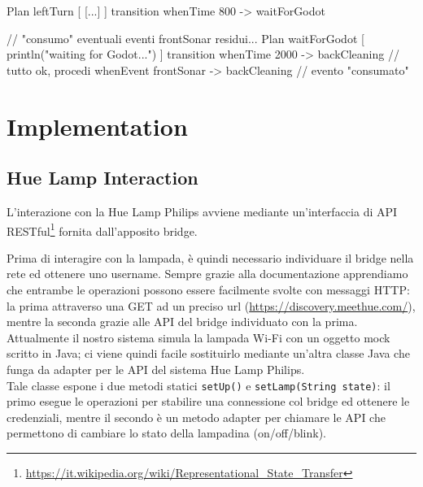 \documentclass{../llncs}
\newcommand{\codescript}[1]{{\mbox{\small{\texttt{#1}}}}\xspace}
\newcommand{\labelsec}[1]{\label{sec:#1}}
\begin{document}
\begin{qacode}[caption={SoftwareAgent, pt12}]
Plan leftTurn [
	[...]
]
transition
	whenTime 800 -> waitForGodot

// "consumo" eventuali eventi frontSonar residui...
Plan waitForGodot [
	println("waiting for Godot...")
]
transition
	whenTime 2000 -> backCleaning // tutto ok, procedi
	whenEvent frontSonar -> backCleaning // evento "consumato"
\end{qacode}

\section{Implementation}
\labelsec{Implementation}

\subsection{Hue Lamp Interaction}
L'interazione con la Hue Lamp Philips avviene mediante un'interfaccia di API RESTful\footnote{\url{https://it.wikipedia.org/wiki/Representational_State_Transfer}} fornita dall'apposito bridge.

Prima di interagire con la lampada, è quindi necessario individuare il bridge nella rete ed ottenere uno username. Sempre grazie alla documentazione apprendiamo che entrambe le operazioni possono essere facilmente svolte con messaggi HTTP: la prima attraverso una GET ad un preciso url (\url{https://discovery.meethue.com/}), mentre la seconda grazie alle API del bridge individuato con la prima.\\

Attualmente il nostro sistema simula la lampada Wi-Fi con un oggetto mock scritto in Java; ci viene quindi facile sostituirlo mediante un'altra classe Java che funga da adapter per le API del sistema Hue Lamp Philips.\\



Tale classe espone i due metodi statici \codescript{setUp()} e \codescript{setLamp(String state)}: il primo esegue le operazioni per stabilire una connessione col bridge ed ottenere le credenziali, mentre il secondo è un metodo adapter per chiamare le API che permettono di cambiare lo stato della lampadina (on/off/blink).\\
\end{document}
